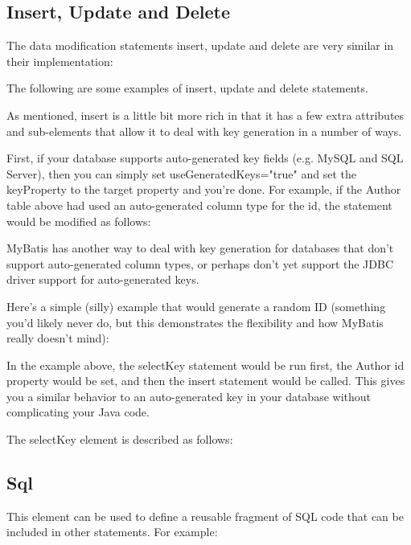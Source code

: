 \subsection{Insert, Update and Delete}
The data modification statements insert, update and delete are very similar in their implementation:



The following are some examples of insert, update and delete statements.



As mentioned, insert is a little bit more rich in that it has a few extra attributes and sub-elements that allow it to deal with key generation in a number of ways.

First, if your database supports auto-generated key fields (e.g. MySQL and SQL Server), then you can simply set useGeneratedKeys="true" and set the keyProperty to the target property and you're done. For example, if the Author table above had used an auto-generated column type for the id, the statement would be modified as follows:



MyBatis has another way to deal with key generation for databases that don't support auto-generated column types, or perhaps don't yet support the JDBC driver support for auto-generated keys.

Here's a simple (silly) example that would generate a random ID (something you'd likely never do, but this demonstrates the flexibility and how MyBatis really doesn't mind):



In the example above, the selectKey statement would be run first, the Author id property would be set, and then the insert statement would be called. This gives you a similar behavior to an auto-generated key in your database without complicating your Java code.

The selectKey element is described as follows:



\subsection{Sql}
This element can be used to define a reusable fragment of SQL code that can be included in other statements. For example:



